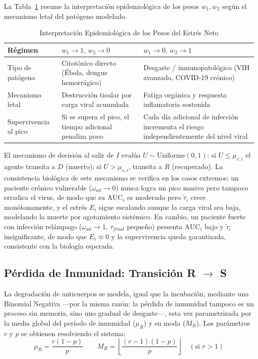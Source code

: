 \documentclass[conference]{IEEEtran}
\begin{document}
La Tabla~\ref{tab:pesos} resume la interpretación epidemiológica de los pesos $w_1, w_2$ según el mecanismo letal del patógeno modelado.

\begin{table}[!t]
\renewcommand{\arraystretch}{1.3}
\caption{Interpretación Epidemiológica de los Pesos del Estrés Neto}
\label{tab:pesos}
\centering
\begin{tabular}{p{2.1cm}p{2.7cm}p{2.7cm}}
\hline
\textbf{Régimen} & \textbf{$w_1\to 1,\, w_2\to 0$} & \textbf{$w_1\to 0,\, w_2\to 1$} \\
\hline
Tipo de patógeno & Citotóxico directo (Ébola, dengue hemorrágico) & Desgaste / inmunopatológico (VIH avanzado, COVID-19 crónico) \\
Mecanismo letal & Destrucción tisular por carga viral acumulada & Fatiga orgánica y respuesta inflamatoria sostenida \\
Supervivencia al pico & Si se supera el pico, el tiempo adicional penaliza poco & Cada día adicional de infección incrementa el riesgo independientemente del nivel viral \\
\hline
\end{tabular}
\end{table}

El mecanismo de decisión al salir de $I$ evalúa $U \sim \text{Uniforme}(0,1)$: si $U \leq \mu_{v,i}$ el agente transita a $D$ (muerto); si $U > \mu_{v,i}$, transita a $R$ (recuperado). La consistencia biológica de este mecanismo se verifica en los casos extremos: un paciente crónico vulnerable ($\omega_{ad}\to 0$) nunca logra un pico masivo pero tampoco erradica el virus, de modo que su $\text{AUC}_i$ es moderado pero $\tilde{\tau}_i$ crece monótonamente, y el estrés $E_i$ sigue escalando aunque la carga viral sea baja, modelando la muerte por agotamiento sistémico. En cambio, un paciente fuerte con infección relámpago ($\omega_{ad}\to 1$, $\tau_{final}$ pequeño) presenta $\text{AUC}_i$ bajo y $\tilde{\tau}_i$ insignificante, de modo que $E_i \approx 0$ y la supervivencia queda garantizada, consistente con la biología esperada.

\subsection{Pérdida de Inmunidad: Transición R $\to$ S}
La degradación de anticuerpos se modela, igual que la incubación, mediante una Binomial Negativa ---por la misma razón: la pérdida de inmunidad tampoco es un proceso sin memoria, sino uno gradual de desgaste---, esta vez parametrizada por la media global del período de inmunidad ($\mu_R$) y su moda ($M_R$). Los parámetros $r$ y $p$ se obtienen resolviendo el sistema:
\begin{equation}
\mu_R = \frac{r(1-p)}{p} \qquad M_R = \left\lfloor \frac{(r-1)(1-p)}{p} \right\rfloor \quad (\text{si } r > 1)
\end{equation}
\end{document}
